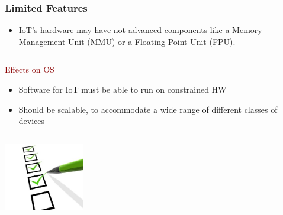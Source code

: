 \documentclass{beamer}
\begin{document}
\begin{frame}
	\frametitle{Limited Features}
	\begin{itemize}
		\justifying
		\item IoT's hardware may have not advanced components like a Memory Management Unit (MMU) or a Floating-Point Unit (FPU).
	\end{itemize}

	\begin{columns}
	\begin{block}{\centering\textcolor{darkred}{Effects on OS}}
		\justifying
		\begin{itemize}
			\item Software for IoT must be able to run on constrained HW
			\item Should be scalable, to accommodate a wide range of different classes of devices
		\end{itemize}
	\end{block}
	\end{columns}
		
	\vspace{0.5cm}
	\hspace*{7cm} \includegraphics[width=3.5cm]{figs/Features.jpg}
\end{frame}
\end{document}
